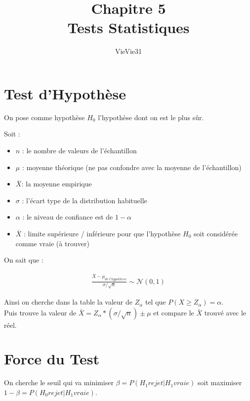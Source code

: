 \documentclass{article}
\title{Chapitre 5 \\ Tests Statistiques}
\author{VieVie31}
\begin{document}
\newtheorem{theo}{Théorème}
\newtheorem{coro}{Corollaire}

\newcommand{\argmax}{\operatornamewithlimits{argmax}}
\newcommand{\likelihood}{{\cal L}}

\maketitle

\section{Test d'Hypothèse}

On pose comme hypothèse $H_0$ l'hypothèse dont on est le plus sûr.

Soit :

\begin{itemize}
    \item $n$ : le nombre de valeurs de l'échantillon
    \item $\mu$ : moyenne théorique (ne pas confondre avec la moyenne de l'échantillon)
    \item $\bar X$: la moyenne empirique
    \item $\sigma$ : l'écart type de la distribution habituelle
    \item $\alpha$ : le niveau de confiance est de $1 - \alpha$
    \item $\bar X$ : limite supérieure / inférieure pour que l'hypothèse $H_0$ soit considérée comme vraie (à trouver)
\end{itemize}

On sait que :

\begin{align*}
    \frac{\bar X - \mu_{de\ l'hypothese}}{\sigma / \sqrt{n}} \sim \mathcal{N}(0, 1)
\end{align*}

Ainsi on cherche dans la table la valeur de $Z_{\alpha}$ tel que $P(X \geq Z_{\alpha}) = \alpha$.\\
Puis trouve la valeur de $\bar X = Z_{\alpha} * (\sigma / \sqrt{n}) \pm \mu$ et compare le $\bar X$ trouvé avec le réel.

\section{Force du Test}

On cherche le seuil qui va minimiser $\beta = P(H_1 rejet | H_1 vraie)$ soit maximiser $1 - \beta = P(H_0 rejet | H_1 vraie)$.
\end{document}
